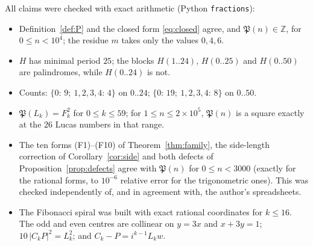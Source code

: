 \documentclass[11pt,a4paper]{article}
\newcommand{\Pent}{\mathfrak{P}}                      %
\newcommand{\Z}{\mathbb{Z}}
\theoremstyle{plain}
\theoremstyle{definition}
\theoremstyle{remark}
\begin{document}
All claims were checked with exact arithmetic (Python \texttt{fractions}):
\begin{itemize}[itemsep=1pt]
  \item Definition~\ref{def:P} and the closed form \eqref{eq:closed} agree, and $\Pent(n)\in\Z$, for $0\le n<10^{4}$; the residue $m$ takes only the values $0,4,6$.
  \item $H$ has minimal period $25$; the blocks $H(1..24)$, $H(0..25)$ and $H(0..50)$ are palindromes, while $H(0..24)$ is not.
  \item Counts: $\{0{:}\,9;\ 1,2,3,4{:}\,4\}$ on $0..24$; $\{0{:}\,19;\ 1,2,3,4{:}\,8\}$ on $0..50$.
  \item $\Pent(L_k)=F_k^{2}$ for $0\le k\le 59$; for $1\le n\le 2\times10^{5}$, $\Pent(n)$ is a square exactly at the $26$ Lucas numbers in that range.
  \item The ten forms (F1)–(F10) of Theorem~\ref{thm:family}, the side-length correction of Corollary~\ref{cor:side} and both defects of Proposition~\ref{prop:defects} agree with $\Pent(n)$ for $0\le n<3000$ (exactly for the rational forms, to $10^{-6}$ relative error for the trigonometric ones). This was checked independently of, and in agreement with, the author's spreadsheets.
  \item The Fibonacci spiral was built with exact rational coordinates for $k\le16$. The odd and even centres are collinear on $y=3x$ and $x+3y=1$; $10\,|C_kP|^{2}=L_k^{2}$; and $C_k-P=i^{k-1}L_kw$.
\end{itemize}
\end{document}
